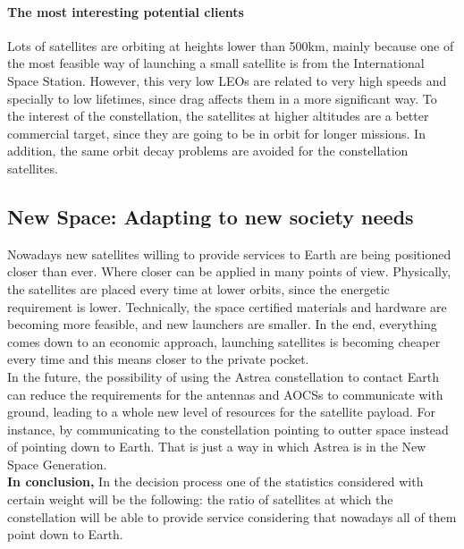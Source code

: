 \newpage

\paragraph{The most interesting potential clients\\}
Lots of satellites are orbiting at heights lower than 500km, mainly because one of the most feasible way of launching a small satellite is from the International Space Station. However, this very low LEOs are related to very high speeds and specially to low lifetimes, since drag affects them in a more significant way. To the interest of the constellation, the satellites at higher altitudes are a better commercial target, since they are going to be in orbit for longer missions. In addition, the same orbit decay problems are avoided for the constellation satellites.

\subsection{New Space: Adapting to new society needs}
Nowadays new satellites willing to provide services to Earth are being positioned closer than ever. Where closer can be applied in many points of view. Physically, the satellites are placed every time at lower orbits, since the energetic requirement is lower. Technically, the space certified materials and hardware are becoming more feasible, and new launchers are smaller. In the end, everything comes down to an economic approach, launching satellites is becoming cheaper every time and this means closer to the private pocket.\\
\newline
In the future, the possibility of using the Astrea constellation to contact Earth can reduce the requirements for the antennas and AOCSs to communicate with ground, leading to a whole new level of resources for the satellite payload. For instance, by communicating to the constellation pointing to outter space instead of pointing down to Earth. That is just a way in which Astrea is in the New Space Generation.\\
\newline
\textbf{In conclusion,} In the decision process one of the statistics considered with certain weight will be the following: the ratio of satellites at which the constellation will be able to provide service considering that nowadays all of them point down to Earth. 
